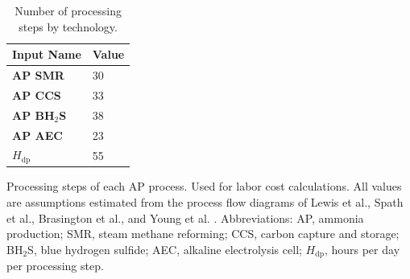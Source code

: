 \documentclass{article}
\begin{document}
\begin{table}[H]
  \centering
  \caption{Number of processing steps by technology.}
  \label{table:processing_steps_by_technology}
  \begin{threeparttable}
    \begin{tabular}{@{}p{8cm}p{4cm}@{}}
      \toprule
      \textbf{Input Name} & \textbf{Value} \\ \midrule
      \textbf{AP SMR} & 30 \\
      \textbf{AP CCS} & 33 \\
      \textbf{AP BH$_2$S} & 38 \\
      \textbf{AP AEC} & 23 \\
      $H_{\text{dp}}$ & 55 \\ \bottomrule
    \end{tabular}
\begin{tablenotes}
  \small
  \item Processing steps of each AP process. Used for labor cost calculations. All values are assumptions estimated from the process flow diagrams of Lewis et al., Spath et al., Brasington et al., and Young et al. \cite{Spath2005, LEWIS2022, Brasington2011, Young2021}. Abbreviations: AP, ammonia production; SMR, steam methane reforming; CCS, carbon capture and storage; BH$_2$S, blue hydrogen sulfide; AEC, alkaline electrolysis cell; $H_{\text{dp}}$, hours per day per processing step.
\end{tablenotes}

  \end{threeparttable}
\end{table}
\end{document}

